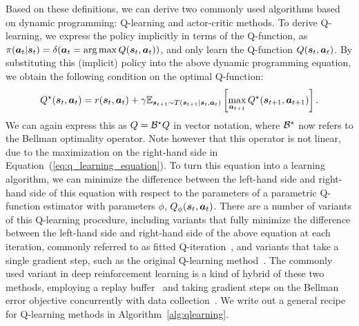 \documentclass[../thesis.tex]{subfiles}
\begin{document}
Based on these definitions, we can derive two commonly used algorithms based on dynamic programming: Q-learning and actor-critic methods. To derive Q-learning, we express the policy implicitly in terms of the Q-function, as \mbox{$\pi(\boldsymbol{a}_t | \boldsymbol{s}_t) = \delta(\boldsymbol{a}_t = \arg\max Q(\boldsymbol{s}_t,\boldsymbol{a}_t))$}, and only learn the Q-function $Q(\boldsymbol{s}_t,\boldsymbol{a}_t)$. By substituting this (implicit) policy into the above dynamic programming equation, we obtain the following condition on the optimal Q-function:
\begin{equation}
Q^\star(\boldsymbol{s}_t, \boldsymbol{a}_t) = r(\boldsymbol{s}_t,\boldsymbol{a}_t) + \gamma \mathbb{E}_{\boldsymbol{s}_{t+1} \sim T(\boldsymbol{s}_{t+1}|\boldsymbol{s}_t,\boldsymbol{a}_t)}\left[
\max_{\boldsymbol{a}_{t+1}} Q^\star(\boldsymbol{s}_{t+1},\boldsymbol{a}_{t+1})
\right]. \label{eq:q_learning_equation}
\end{equation}
We can again express this as ${Q} = \mathcal{B}^\star {Q}$ in vector notation, where $\mathcal{B}^\star$ now refers to the Bellman optimality operator. Note however that this operator is not linear, due to the maximization on the right-hand side in Equation~(\ref{eq:q_learning_equation}). To turn this equation into a learning algorithm, we can minimize the difference between the left-hand side and right-hand side of this equation with respect to the parameters of a parametric Q-function estimator with parameters $\phi$, $Q_\phi(\boldsymbol{s}_t,\boldsymbol{a}_t)$. There are a number of variants of this Q-learning procedure, including variants that fully minimize the difference between the left-hand side and right-hand side of the above equation at each iteration, commonly referred to as fitted Q-iteration~\citep{ernst2005tree,riedmiller2005neural}, and variants that take a single gradient step, such as the original Q-learning method~\citep{watkins1992q}. The commonly used variant in deep reinforcement learning is a kind of hybrid of these two methods, employing a replay buffer~\citep{lin1992self} and taking gradient steps on the Bellman error objective concurrently with data collection~\citep{mnih2013playing}. We write out a general recipe for Q-learning methods in Algorithm~\ref{alg:qlearning}.
\end{document}

